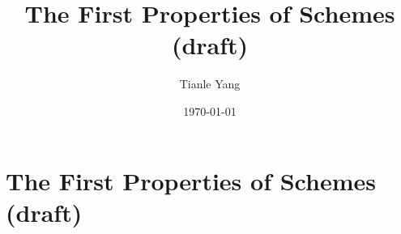 \documentclass{noteformyself}
\title{The First Properties of Schemes (draft)}
\author{Tianle Yang}
\date{\today}
\begin{document}
    \maketitle

    \section{The First Properties of Schemes (draft)}


\end{document}
